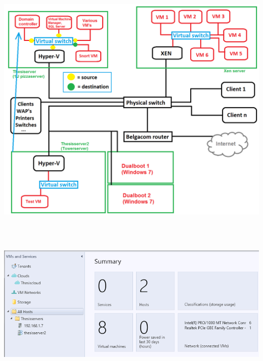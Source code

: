 \documentclass[11pt, a4paper]{article}
\begin{document}
$\;$ \\ \\
\noindent\begin{minipage}{\textwidth}
    \centering
    \includegraphics[width=\textwidth]{Network.png}
\end{minipage}
$\;$ \\ \\
\noindent\begin{minipage}{\textwidth}
    \centering
    \includegraphics[width=\textwidth]{Cloud_3.png}
\end{minipage}
$\;$ \\ \\
\end{document}
